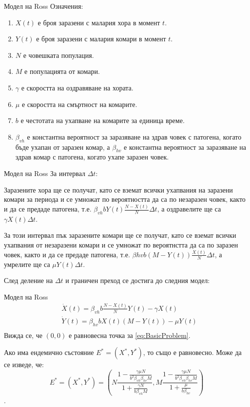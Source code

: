 \begin{frame}[t]{Модел на Ross}
  Означения:
  \begin{enumerate}
    \item $X(t)$ е броя заразени с малария хора в момент $t$.
    \item $Y(t)$ е броя заразени с малария комари в момент $t$.
    \item $N$ е човешката популация.
    \item $M$ е популацията от комари.
    \item $\gamma$ е скоростта на оздравяване на хората.
    \item $\mu$ е скоростта на смъртност на комарите.
    \item $b$ е честотата на ухапване на комарите за единица време.
    \item $\beta_{vh}$ е константна вероятност за заразяване на здрав човек с патогена, когато бъде ухапан от заразен комар, а $\beta_{hv}$ е константна вероятност за заразяване на здрав комар с патогена, когато ухапе заразен човек.
  \end{enumerate}
\end{frame}

\begin{frame}[t]{Модел на Ross}
  За интервал $\Delta t$:

  Заразените хора ще се получат, като се вземат всички ухапвания на заразени комари за периода и се умножат по вероятността да са по незаразен човек, както и да се предаде патогена, т.е. $\beta_{vh} b Y(t) \frac{N-X(t)}{N} \Delta t$, а оздравелите ще са $\gamma X(t) \Delta t$.

  За този интервал пък заразените комари ще се получат, като се вземат всички ухапвания от незаразени комари и се умножат по вероятнстта да са по заразен човек, както и да се предаде патогена, т.е. $\beta{hv} b (M - Y(t)) \frac{X(t)}{N} \Delta t$, а умрелите ще са $\mu Y(t) \Delta t$.

  След деление на $\Delta t$ и граничен преход се достига до следния модел:
\end{frame}

\begin{frame}[t]{Модел на Ross}
  \begin{equation}
    \label{eq:BasicProblem}
    \begin{split}
      &\dot{X}(t) = \beta_{vh} b \frac{N-X(t)}{N} Y(t) - \gamma X(t) \\
      &\dot{Y}(t) = \beta_{hv} b X(t) (M-Y(t)) - \mu Y(t) \\
    \end{split}
  \end{equation}
  Вижда се, че $(0, 0)$ е равновесна точка за \ref{eq:BasicProblem}.

  Ако има ендемично състояние $E^* = (X^*, Y^*)$, то също е равновесно. Може да се изведе, че:
  \begin{equation*}
    E^* = (X^*, Y^*) = \left(N \frac{1 - \frac{\gamma \mu N}{b^2 \beta_{vh} \beta_{hv} M}}{1 + \frac{\gamma N}{b \beta_{vh} M}}, M \frac{1 - \frac{\gamma \mu N}{b^2 \beta_{vh} \beta_{hv} M}}{1 + \frac{\mu}{b \beta_{hv}}}\right)
  \end{equation*}.
\end{frame}

